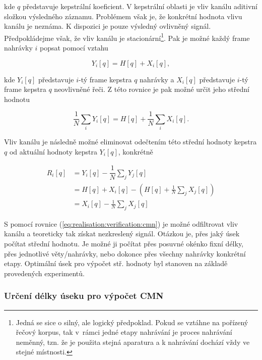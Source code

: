 \noindent kde $q$ představuje kepstrální koeficient.
V kepstrální oblasti je vliv kanálu aditivní složkou výsledného záznamu.
Problémem však je, že konkrétní hodnota vlivu kanálu je neznáma.
K dispozici je pouze výsledný ovlivněný signál.
Předpokládejme však, že vliv kanálu je stacionární\footnote{Jedná se sice o silný, ale logický předpoklad. Pokud se vztáhne na pořízený řečový korpus, tak v~rámci jedné etapy nahrávání je proces nahrávání neměnný, tzn. že je použita stejná aparatura a k nahrávání dochází vždy ve stejné místnosti.}.
Pak je možné každý frame nahrávky $i$ popsat pomocí vztahu

\begin{equation}
  Y_i\left[q\right] = H\left[q\right] + X_i\left[q\right],
\end{equation}

\noindent kde $Y_i\left[q\right]$ představuje $i$-tý frame kepstra $q$ nahrávky a $X_i\left[q\right]$ představuje $i$-tý frame kepstra $q$ neovlivněné řeči.
Z této rovnice je pak možné určit jeho střední hodnotu

\begin{equation}
  \frac{1}{N} \sum_i Y_i\left[q\right] = H\left[q\right] + \frac{1}{N} \sum_i X_i\left[q\right].
\end{equation}

\noindent Vliv kanálu je následně možné eliminovat odečtením této střední hodnoty kepstra $q$ od aktuální hodnoty kepstra $Y_i\left[q\right]$, konkrétně

\begin{align}
  R_i\left[q\right] &= Y_i\left[q\right] - \dfrac{1}{N}\sum_{j} Y_j\left[q\right] \nonumber  \\
  &= H\left[q\right] + X_i\left[q\right] - \left( H\left[q\right] + \frac{1}{N} \sum_j X_j\left[q\right] \right) \nonumber  \\
  &= X_i\left[q\right] - \frac{1}{N} \sum_j X_j\left[q\right]
  \label{eq:realisation:verification:cmn}
\end{align}

\noindent S pomocí rovnice (\ref{eq:realisation:verification:cmn}) je možné odfiltrovat vliv kanálu a teoreticky tak získat nezkreslený signál.
Otázkou je, přes jaký úsek počítat střední hodnotu.
Je možné ji počítat přes posuvné okénko fixní délky, přes jednotlivé věty/nahrávky, nebo dokonce přes všechny nahrávky konkrétní etapy.
Optimální úsek pro výpočet stř. hodnoty byl stanoven na základě provedených experimentů.

\subsubsection{Určení délky úseku pro výpočet CMN}


